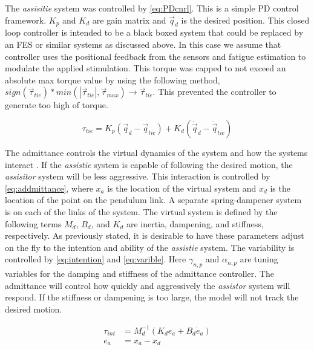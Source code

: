 The \textit{assisitie} system was controlled by \autoref{eq:PDcnrl}. This is a simple PD control framework. $K_p$ and $K_d$ are gain matrix and $\vec{q}_d$ is the desired position. This closed loop controller is intended to be a black boxed system that could be replaced by an FES or similar systems as discussed above. In this case we assume that controller uses the positional feedback from the sensors and fatigue estimation to modulate the applied stimulation. This torque was capped to not exceed an absolute max torque value by using the following method, $ sign(\vec{\tau}_{tie})* min( | \vec{\tau}_{tie}|, \vec{\tau}_{max}) \rightarrow \vec{\tau}_{tie} $.  This prevented the controller to generate too high of torque. 

\begin{equation}
        \tau_{tie} = K_p( \vec{q}_d - \vec{q}_{tie} ) + K_d ( \dot{\vec{q}}_d - \dot{\vec{q}}_{tie} ) 
    \label{eq:PDcnrl}
\end{equation}

The admittance controls the virtual dynamics of the system and how the systems interact \cite{faulring2005haptic}. If the \textit{assistie} system is capable of following the desired motion, the \textit{assisitor} system will be less aggressive. This interaction is controlled by \autoref{eq:addmittance}, where $x_a$ is the location of the virtual system and $x_d$ is the location of the point on the pendulum link. A separate spring-dampener system is on each of the links of the system. The virtual system is defined by the following terms $M_d$, $B_d$, and $K_d$ are inertia, dampening, and stiffness, respectively. As previously stated, it is desirable to have these parameters adjust on the fly to the intention and ability of the \textit{assistie} system. The variability is controlled by \autoref{eq:intention} and \autoref{eq:varible}. Here $\gamma_{n,p}$ and $\alpha_{n,p}$ are tuning variables for the damping and stiffness of the admittance controller. The admittance will control how quickly and aggressively the \textit{assistor} system will respond. If the stiffness or dampening is too large, the model will not track the desired motion.   

\begin{equation}
    \begin{aligned}
        \tau_{int} &= M_d^{-1}( K_d e_a + B_d \dot{e}_a)  \\
        e_a &= x_a - x_d 
    \end{aligned}
    \label{eq:addmittance}
\end{equation}

